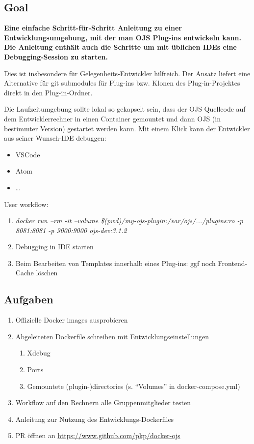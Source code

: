 \documentclass{article}
\begin{document}
\subsection{Goal}
{\bfseries Eine einfache Schritt-für-Schritt Anleitung zu einer Entwicklungsumgebung, mit der man OJS Plug-ins entwickeln kann. Die Anleitung enthält auch die Schritte um mit üblichen IDEs eine Debugging-Session zu starten.}\par
Dies ist insbesondere für Gelegenheits-Entwickler hilfreich. Der Ansatz liefert eine Alternative für git submodules für Plug-ins bzw. Klonen des Plug-in-Projektes direkt in den Plug-in-Ordner.\par
Die Laufzeitumgebung sollte lokal so gekapselt sein, dass der OJS Quellcode auf dem Entwicklerrechner in einen Container gemountet und dann OJS (in bestimmter Version) gestartet werden kann. Mit einem Klick kann der Entwickler aus seiner Wunsch-IDE debuggen:
\begin{itemize}
\item VSCode
\item Atom
\item …
\end{itemize} 
User workflow:


\begin{enumerate}
\item {\itshape docker run --rm -it --volume \$(pwd)/my-ojs-plugin:/var/ojs/.../plugins:ro -p 8081:8081 -p 9000:9000 ojs-dev:3.1.2}
\item Debugging in IDE starten
\item Beim Bearbeiten von Templates innerhalb eines Plug-ins: ggf noch Frontend-Cache löschen
\end{enumerate}
\subsection[{Aufgaben}]{\label{2nr34glqlyi}Aufgaben}
\begin{enumerate}
\item Offizielle Docker images ausprobieren
\item Abgeleiteten Dockerfile schreiben mit Entwicklungseinstellungen
\begin{enumerate}
\item Xdebug
\item Ports
\item Gemountete (plugin-)directories (s. “Volumes” in docker-compose.yml)
\end{enumerate}
\item Workflow auf den Rechnern alle Gruppenmitglieder testen
\item Anleitung zur Nutzung des Entwicklungs-Dockerfiles
\item PR öffnen an \url{https://www.github.com/pkp/docker-ojs}
\end{enumerate}
\end{document}
